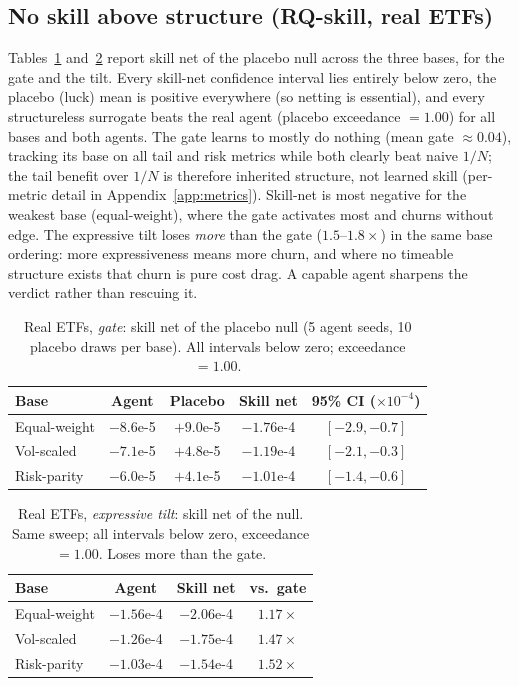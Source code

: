 \documentclass[sigconf,anonymous,review]{acmart}
\begin{document}
\subsection{No skill above structure (RQ-skill, real ETFs)}\label{sec:rq1}
Tables~\ref{tab:rq1gate} and~\ref{tab:rq1tilt} report skill net of the placebo null
across the three bases, for the gate and the tilt. Every skill-net confidence
interval lies entirely below zero, the placebo (luck) mean is positive everywhere
(so netting is essential), and every structureless surrogate beats the real agent
(placebo exceedance $=1.00$) for all bases and both agents. The gate learns to mostly
do nothing (mean gate $\approx0.04$), tracking its base on all tail and risk metrics
while both clearly beat naive $1/N$; the tail benefit over $1/N$ is therefore
inherited structure, not learned skill (per-metric detail in
Appendix~\ref{app:metrics}). Skill-net is most negative for the weakest base
(equal-weight), where the gate activates most and churns without edge. The expressive
tilt loses \emph{more} than the gate ($1.5$--$1.8\times$) in the same base ordering:
more expressiveness means more churn, and where no timeable structure exists that
churn is pure cost drag. A capable agent sharpens the verdict rather than rescuing it.

\begin{table}[t]
  \caption{Real ETFs, \emph{gate}: skill net of the placebo null (5 agent seeds, 10
  placebo draws per base). All intervals below zero; exceedance $=1.00$.}
  \label{tab:rq1gate}
  \small
  \begin{tabular}{lcccc}
    \toprule
    Base & Agent & Placebo & Skill net & 95\% CI ($\times10^{-4}$)\\
    \midrule
    Equal-weight & $-8.6$e-5 & $+9.0$e-5 & $-1.76$e-4 & $[-2.9,-0.7]$\\
    Vol-scaled   & $-7.1$e-5 & $+4.8$e-5 & $-1.19$e-4 & $[-2.1,-0.3]$\\
    Risk-parity  & $-6.0$e-5 & $+4.1$e-5 & $-1.01$e-4 & $[-1.4,-0.6]$\\
    \bottomrule
  \end{tabular}
\end{table}

\begin{table}[t]
  \caption{Real ETFs, \emph{expressive tilt}: skill net of the null. Same sweep;
  all intervals below zero, exceedance $=1.00$. Loses more than the gate.}
  \label{tab:rq1tilt}
  \small
  \begin{tabular}{lccc}
    \toprule
    Base & Agent & Skill net & vs.\ gate\\
    \midrule
    Equal-weight & $-1.56$e-4 & $-2.06$e-4 & $1.17\times$\\
    Vol-scaled   & $-1.26$e-4 & $-1.75$e-4 & $1.47\times$\\
    Risk-parity  & $-1.03$e-4 & $-1.54$e-4 & $1.52\times$\\
    \bottomrule
  \end{tabular}
\end{table}
\end{document}

